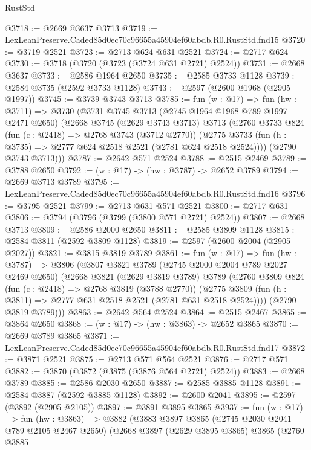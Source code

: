 \begin{lexlean}{RustStd}
\begin{coremodule}
@3718 := @2669 @3637 @3713
@3719 := LexLeanPreserve.Caded85d0ec70c96655a45904ef60abdb.R0.RustStd.fnd15
@3720 := @3719 @2521
@3723 := @2713 @624 @631 @2521
@3724 := @2717 @624
@3730 := @3718 (@3720 (@3723 (@3724 @631 @2721) @2524))
@3731 := @2668 @3637
@3733 := @2586 @1964 @2650
@3735 := @2585 @3733 @1128
@3739 := @2584 @3735 (@2592 @3733 @1128)
@3743 := @2597 (@2600 @1968 (@2905 @1997))
@3745 := @3739 @3743 @3713
@3785 := fun (w : @17) =>
  fun (hw : @3711) =>
  @3730
    (@3731
      @3745
      @3713
      (@2745 @1964 @1968 @789 @1997 @2471 @2650)
      (@2668
        @3745
        (@2629 @3743 @3713)
        @3713
        (@2760
          @3733
          @824
          (fun (c : @2418) => @2768 @3743 (@3712 @2770))
          (@2775 @3733 (fun (h : @3735) => @2777 @624 @2518 @2521 (@2781 @624 @2518 @2524))))
        (@2790 @3743 @3713)))
@3787 := @2642 @571 @2524
@3788 := @2515 @2469
@3789 := @3788 @2650
@3792 := (w : @17) -> (hw : @3787) -> @2652 @3789
@3794 := @2669 @3713 @3789
@3795 := LexLeanPreserve.Caded85d0ec70c96655a45904ef60abdb.R0.RustStd.fnd16
@3796 := @3795 @2521
@3799 := @2713 @631 @571 @2521
@3800 := @2717 @631
@3806 := @3794 (@3796 (@3799 (@3800 @571 @2721) @2524))
@3807 := @2668 @3713
@3809 := @2586 @2000 @2650
@3811 := @2585 @3809 @1128
@3815 := @2584 @3811 (@2592 @3809 @1128)
@3819 := @2597 (@2600 @2004 (@2905 @2027))
@3821 := @3815 @3819 @3789
@3861 := fun (w : @17) =>
  fun (hw : @3787) =>
  @3806
    (@3807
      @3821
      @3789
      (@2745 @2000 @2004 @789 @2027 @2469 @2650)
      (@2668
        @3821
        (@2629 @3819 @3789)
        @3789
        (@2760
          @3809
          @824
          (fun (c : @2418) => @2768 @3819 (@3788 @2770))
          (@2775 @3809 (fun (h : @3811) => @2777 @631 @2518 @2521 (@2781 @631 @2518 @2524))))
        (@2790 @3819 @3789)))
@3863 := @2642 @564 @2524
@3864 := @2515 @2467
@3865 := @3864 @2650
@3868 := (w : @17) -> (hw : @3863) -> @2652 @3865
@3870 := @2669 @3789 @3865
@3871 := LexLeanPreserve.Caded85d0ec70c96655a45904ef60abdb.R0.RustStd.fnd17
@3872 := @3871 @2521
@3875 := @2713 @571 @564 @2521
@3876 := @2717 @571
@3882 := @3870 (@3872 (@3875 (@3876 @564 @2721) @2524))
@3883 := @2668 @3789
@3885 := @2586 @2030 @2650
@3887 := @2585 @3885 @1128
@3891 := @2584 @3887 (@2592 @3885 @1128)
@3892 := @2600 @2041
@3895 := @2597 (@3892 (@2905 @2105))
@3897 := @3891 @3895 @3865
@3937 := fun (w : @17) =>
  fun (hw : @3863) =>
  @3882
    (@3883
      @3897
      @3865
      (@2745 @2030 @2041 @789 @2105 @2467 @2650)
      (@2668
        @3897
        (@2629 @3895 @3865)
        @3865
        (@2760
          @3885

\end{coremodule}
\end{lexlean}
